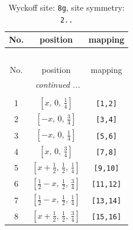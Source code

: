\documentclass[fleqn,8pt]{jsarticle}
\begin{document}
\renewcommand{\arraystretch}{1.2}
\begin{longtable}{ccc}
\caption{Wyckoff site: {\tt 8g}, site symmetry: {\tt 2..}}
 \\
 \hline \hline
No. & position & mapping \\ \hline \endfirsthead

\multicolumn{2}{l}{\tablename\ \thetable{}} \\
 \hline \hline
No. & position & mapping \\ \hline \endhead

 \hline \hline
\multicolumn{2}{r}{\footnotesize\it continued ...} \\ \endfoot

 \hline \hline
\multicolumn{2}{r}{} \\ \endlastfoot

1 & $\left[ x,\, 0,\, \frac{1}{4} \right]$ & {\tt [1,2]} \\ \hline
2 & $\left[ - x,\, 0,\, \frac{3}{4} \right]$ & {\tt [3,4]} \\ \hline
3 & $\left[ - x,\, 0,\, \frac{1}{4} \right]$ & {\tt [5,6]} \\ \hline
4 & $\left[ x,\, 0,\, \frac{3}{4} \right]$ & {\tt [7,8]} \\ \hline
5 & $\left[ x + \frac{1}{2},\, \frac{1}{2},\, \frac{1}{4} \right]$ & {\tt [9,10]} \\ \hline
6 & $\left[ \frac{1}{2} - x,\, \frac{1}{2},\, \frac{3}{4} \right]$ & {\tt [11,12]} \\ \hline
7 & $\left[ \frac{1}{2} - x,\, \frac{1}{2},\, \frac{1}{4} \right]$ & {\tt [13,14]} \\ \hline
8 & $\left[ x + \frac{1}{2},\, \frac{1}{2},\, \frac{3}{4} \right]$ & {\tt [15,16]} \\
\end{longtable}
\renewcommand{\arraystretch}{1.2}
\end{document}
